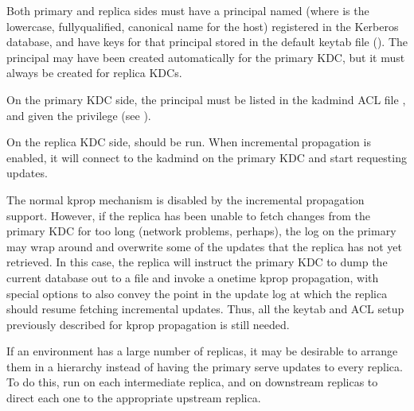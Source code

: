 \documentclass[letterpaper,10pt,english]{sphinxmanual}
\begin{document}
\sphinxAtStartPar
Both primary and replica sides must have a principal named
 (where  is the lowercase,
fully\sphinxhyphen{}qualified, canonical name for the host) registered in the
Kerberos database, and have keys for that principal stored in the
default keytab file ({\hyperref[\detokenize{mitK5defaults:paths}]{}}).  The  principal may
have been created automatically for the primary KDC, but it must
always be created for replica KDCs.

\sphinxAtStartPar
On the primary KDC side, the  principal must be
listed in the kadmind ACL file {\hyperref[\detokenize{admin/conf_files/kadm5_acl:kadm5-acl-5}]{}}, and given the
 privilege (see {\hyperref[\detokenize{admin/database:privileges}]{}}).

\sphinxAtStartPar
On the replica KDC side, {\hyperref[\detokenize{admin/admin_commands/kpropd:kpropd-8}]{}} should be run.  When
incremental propagation is enabled, it will connect to the kadmind on
the primary KDC and start requesting updates.

\sphinxAtStartPar
The normal kprop mechanism is disabled by the incremental propagation
support.  However, if the replica has been unable to fetch changes
from the primary KDC for too long (network problems, perhaps), the log
on the primary may wrap around and overwrite some of the updates that
the replica has not yet retrieved.  In this case, the replica will
instruct the primary KDC to dump the current database out to a file
and invoke a one\sphinxhyphen{}time kprop propagation, with special options to also
convey the point in the update log at which the replica should resume
fetching incremental updates.  Thus, all the keytab and ACL setup
previously described for kprop propagation is still needed.

\sphinxAtStartPar
If an environment has a large number of replicas, it may be desirable
to arrange them in a hierarchy instead of having the primary serve
updates to every replica.  To do this, run  on
each intermediate replica, and  on
downstream replicas to direct each one to the appropriate upstream
replica.
\end{document}
